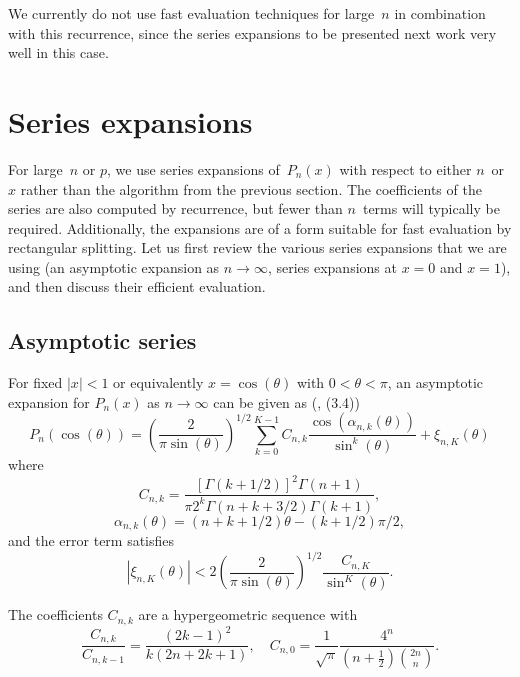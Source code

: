 \documentclass{siamart0216}
\begin{document}
We currently do not use fast evaluation techniques for large~$n$ in
combination with this recurrence, since the series expansions to be
presented next work very well in this case.

\section{Series expansions}

\label{sec:series}

For large $n$ or $p$, we use series expansions of $P_n(x)$ with
respect to either $n$ or $x$ rather than the algorithm from the
previous section.
The coefficients of the series are also computed by recurrence,
but fewer than $n$ terms will typically be required.
Additionally, the expansions are of a form suitable for fast
evaluation by rectangular splitting.
Let us first review the various series expansions that we are using
(an asymptotic expansion as $n \to \infty$, series expansions at $x=0$
and $x=1$), and then discuss their efficient evaluation.

\subsection{Asymptotic series}

For fixed $|x| < 1$ or equivalently $x = \cos(\theta)$ with $0 < \theta < \pi$,
an asymptotic expansion for $P_n(x)$ as $n \to \infty$
can be given as (\cite{Bogaert2012}, (3.4))
\begin{equation}
\label{eq:asymptotic}
P_n(\cos(\theta)) = \left(\frac{2}{\pi \sin(\theta)}\right)^{1/2}
\sum_{k=0}^{K-1} C_{n,k} \frac{\cos(\alpha_{n,k}(\theta))}{\sin^k(\theta)}
+ \xi_{n,K}(\theta)
\end{equation}
where
\begin{equation}
C_{n,k} = \frac{[\Gamma(k+1/2)]^2 \Gamma(n+1)}{\pi 2^k \Gamma(n+k+3/2) \Gamma(k+1)},
\end{equation}
\begin{equation}
\alpha_{n,k}(\theta) = (n+k+1/2) \theta - (k+1/2) \pi / 2,
\end{equation}
and the error term satisfies
\begin{equation}
\label{eq:truncerr0}
|\xi_{n,K}(\theta)| < 2 \left(\frac{2}{\pi \sin(\theta)}\right)^{1/2} \frac{C_{n,K}}{\sin^K(\theta)}.
\end{equation}

The coefficients $C_{n,k}$ are a hypergeometric sequence with
$$\frac{C_{n,k}}{C_{n,k-1}} = \frac{(2k-1)^2}{k (2n+2k+1)}, \quad C_{n,0} = \frac{1}{\sqrt{\pi}} \frac{4^n}{(n+\tfrac{1}{2}) {2n \choose n}}.$$
\end{document}
